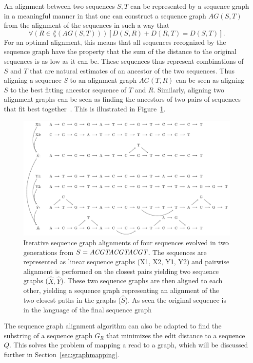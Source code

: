 An alignment between two sequences $S, T$ can be represented by a sequence graph in a meaningful manner in that one can construct a sequence graph $AG(S, T)$ from the alignment of the sequences in such a way that 
\[
\forall (R \in \lang(AG(S, T)))\left[D(S, R)+D(R, T) =  D(S, T)\right].
\]
For an optimal alignment, this means that all sequences recognized by the sequence graph have the property that the sum of the distance to the original sequences is as low as it can be.
These sequences thus represent combinations of $S$ and $T$ that are natural estimates of an ancestor of the two sequences.
Thus aligning a sequence $S$ to an alignment graph $AG(T, R)$  can be seen as aligning $S$ to the best fitting ancestor sequence of $T$ and $R$.
Similarly, aligning two alignment graphs can be seen as finding the ancestors of two pairs of sequences that fit best together~\cite{treealign, poa2}.
This is illustrated in Figure~\ref{fig:treealign}.

\begin{figure}
  \includegraphics[width=\textwidth]{figures/graph_msa}

  \caption{
    Iterative sequence graph alignments of four sequences evolved in two generations from $S=\emph{ACGTACGTACGT}$.
    The sequences are represented as linear sequence graphs (X1, X2, Y1, Y2) and pairwise alignment is performed on the closest pairs yielding two sequence graphs ($\hat{X}, \hat{Y}$).
    These two sequence graphs are then aligned to each other, yielding a sequence graph representing an alignment of the two closest paths in the graphs ($\hat{S}$).
    As seen the original sequence is in the language of the final sequence graph}
  \label{fig:treealign}
\end{figure}

The sequence graph alignment algorithm can also be adapted to find the substring of a sequence graph $G_R$ that minimizes the edit distance to a sequence $Q$.
This solves the problem of mapping a read to a graph, which will be discussed further in Section~\ref{sec:graphmapping}.


